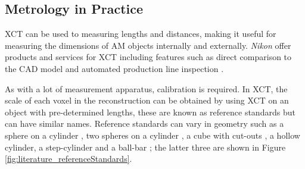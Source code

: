 \subsection{Metrology in Practice}

XCT can be used to measuring lengths and distances, making it useful for measuring the dimensions of AM objects internally and externally. \emph{Nikon} offer products and services for XCT including features such as direct comparison to the CAD model \citep{nikon2015microfocus, nikon2018mct225} and automated production line inspection \citep{nikon2015inline, nikon2018automated}.

As with a lot of measurement apparatus, calibration is required. In XCT, the scale of each voxel in the reconstruction can be obtained by using XCT on an object with pre-determined lengths, these are known as reference standards \citep{bartscher2007enhancement} but can have similar names. Reference standards can vary in geometry such as a sphere on a cylinder \citep{lifton2013application}, two spheres on a cylinder \citep{sun2016reference}, a cube with cut-outs \citep{kiekens2011test}, a hollow cylinder, a step-cylinder and a ball-bar \citep{bartscher2007enhancement}; the latter three are shown in Figure \ref{fig:literature_referenceStandards}.

